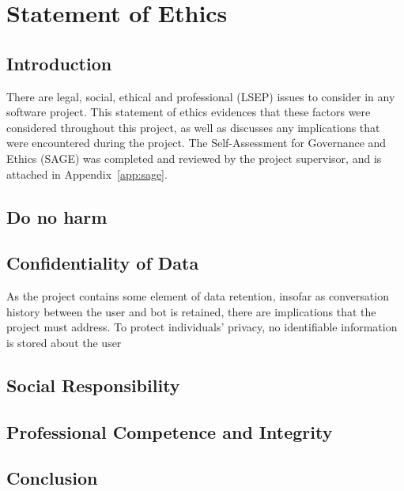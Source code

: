 \chapter{Statement of Ethics}
\label{ch:ethics}

\section{Introduction}
There are legal, social, ethical and professional (LSEP) issues to consider in any software project. This statement of ethics evidences that these factors were  considered throughout this project, as well as discusses any implications that were encountered during the project. The Self-Assessment for Governance and Ethics (SAGE) was completed and reviewed by the project supervisor, and is attached in Appendix~\ref{app:sage}.

\section{Do no harm}

\section{Confidentiality of Data}
As the project contains some element of data retention, insofar as conversation history between the user and bot is retained, there are implications that the project must address. To protect individuals' privacy, no identifiable information is stored about the user

\section{Social Responsibility}

\section{Professional Competence and Integrity}

\section{Conclusion}